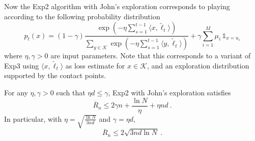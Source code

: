 \documentclass[11pt]{hackednow}
\newcommand{\cK}{\mathcal{K}}
\newcommand{\oR}{\overline{R}}
\def\ds1{\mathds{1}}
\renewcommand{\tilde}{\widetilde}
\begin{document}
Now the Exp2 algorithm with John's exploration corresponds to playing according to the following probability distribution
\begin{equation}
\label{eq:exp2def}
p_t(x) = (1- \gamma) \frac{\exp\left(- \eta \sum_{s=1}^{t-1} \langle x, \tilde{\ell}_t \rangle  \right)}{\sum_{y \in \cK} \exp\left(- \eta \sum_{s=1}^{t-1} \langle y, \tilde{\ell}_t \rangle  \right)} + \gamma \sum_{i=1}^M \mu_i\,\ds1_{x = u_i}
\end{equation}
where $\eta,\gamma > 0$ are input parameters. Note that this corresponds to a variant of Exp3 using $\langle x, \tilde{\ell}_t \rangle$ as loss estimate for $x \in \cK$, and an exploration distribution supported by the contact points.
\begin{theorem} \label{th:exp2john}
For any $\eta,\gamma > 0$ such that ${\eta d} \le {\gamma}$, Exp2 with John's exploration satisfies
$$\oR_n \leq 2 \gamma n + \frac{\ln N}{\eta} + \eta n d~.$$
In particular, with $\eta = \sqrt{\frac{\ln N}{3 n d}}$ and $\gamma = \eta d$,
$$\oR_n \leq 2 \sqrt{3 n d \ln N}~.$$
\end{theorem}
\end{document}
